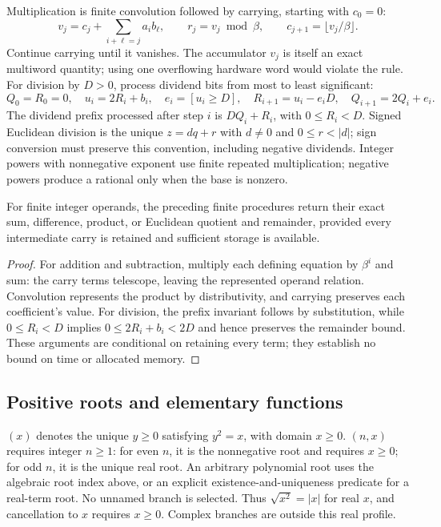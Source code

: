 Multiplication is finite convolution followed by carrying, starting with $c_0=0$:
\[
 v_j=c_j+\sum_{i+\ell=j}a_i b_\ell,
 \qquad r_j=v_j\bmod\beta,
 \qquad c_{j+1}=\lfloor v_j/\beta\rfloor.
\]
Continue carrying until it vanishes. The accumulator $v_j$ is itself an exact
multiword quantity; using one overflowing hardware word would violate the rule.
For division by $D>0$, process dividend bits from most to least significant:
\[
 Q_0=R_0=0,\quad u_i=2R_i+b_i,\quad e_i=[u_i\ge D],\quad
 R_{i+1}=u_i-e_iD,\quad Q_{i+1}=2Q_i+e_i.
\]
The dividend prefix processed after step $i$ is $DQ_i+R_i$, with
$0\le R_i<D$. Signed Euclidean division is the unique
$z=dq+r$ with $d\ne0$ and $0\le r<|d|$; sign conversion must preserve this
convention, including negative dividends. Integer powers with nonnegative
exponent use finite repeated multiplication; negative powers produce a rational
only when the base is nonzero.

\begin{proposition}
For finite integer operands, the preceding finite procedures return their exact
sum, difference, product, or Euclidean quotient and remainder, provided every
intermediate carry is retained and sufficient storage is available.
\end{proposition}
\begin{proof}
For addition and subtraction, multiply each defining equation by $\beta^i$
and sum: the carry terms telescope, leaving the represented operand relation.
Convolution represents the product by distributivity, and carrying preserves
each coefficient's value. For division, the prefix invariant follows by
substitution, while $0\le R_i<D$ implies $0\le2R_i+b_i<2D$ and hence preserves
the remainder bound. These arguments are conditional on retaining every term;
they establish no bound on time or allocated memory.
\end{proof}

\subsection{Positive roots and elementary functions}
$(x)$ denotes the unique $y\ge0$ satisfying $y^2=x$, with domain
$x\ge0$. $(n,x)$ requires integer $n\ge1$: for even $n$, it is the
nonnegative root and requires $x\ge0$; for odd $n$, it is the unique real root.
An arbitrary polynomial root uses the algebraic root index above, or an explicit
existence-and-uniqueness predicate for a real-term root. No unnamed branch is
selected. Thus $\sqrt{x^2}=|x|$ for real $x$, and cancellation to $x$ requires
$x\ge0$. Complex branches are outside this real profile.

